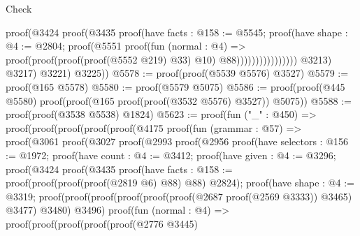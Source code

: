 \begin{lexlean}{Check}
\begin{coremodule}
                                        proof(@3424
                                            proof(@3435
                                                proof(have facts : @158 := @5545;
                                                  proof(have shape : @4 := @2804;
                                                    proof(@5551
                                                        proof(fun (normal : @4) =>
                                                          proof(proof(proof(proof(@5552 @219) @33)
                                                                @10)
                                                              @88))))))))))))))))
              @3213)
            @3217)
          @3221)
        @3225))
@5578 := proof(proof(@5539 @5576) @3527)
@5579 := proof(@165 @5578)
@5580 := proof(@5579 @5075)
@5586 := proof(proof(@445 @5580) proof(proof(@165 proof(proof(@3532 @5576) @3527)) @5075))
@5588 := proof(proof(@3538 @5538) @1824)
@5623 := proof(fun ("_" : @450) =>
    proof(proof(proof(proof(proof(@4175
                proof(fun (grammar : @57) =>
                  proof(@3061
                      proof(@3027
                          proof(@2993
                              proof(@2956
                                  proof(have selectors : @156 := @1972;
                                    proof(have count : @4 := @3412;
                                      proof(have given : @4 := @3296;
                                        proof(@3424
                                            proof(@3435
                                                proof(have facts : @158 := proof(proof(proof(proof(@2819
                                                            @6)
                                                          @88)
                                                        @88)
                                                      @2824);
                                                  proof(have shape : @4 := @3319;
                                                    proof(proof(proof(proof(proof(proof(@2687
                                                                  proof(@2569 @3333))
                                                                @3465)
                                                              @3477)
                                                            @3480)
                                                          @3496)
                                                        proof(fun (normal : @4) =>
                                                          proof(proof(proof(proof(proof(@2776 @3445)

\end{coremodule}
\end{lexlean}
